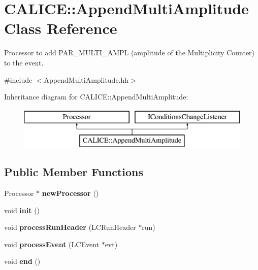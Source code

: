 \section{C\-A\-L\-I\-C\-E\-:\-:Append\-Multi\-Amplitude Class Reference}
\label{classCALICE_1_1AppendMultiAmplitude}


Processor to add P\-A\-R\-\_\-\-M\-U\-L\-T\-I\-\_\-\-A\-M\-P\-L (amplitude of the Multiplicity Counter) to the event.  




{\ttfamily \#include $<$Append\-Multi\-Amplitude.\-hh$>$}

Inheritance diagram for C\-A\-L\-I\-C\-E\-:\-:Append\-Multi\-Amplitude\-:\begin{figure}[H]
\begin{center}
\leavevmode
\includegraphics[height=2.000000cm]{classCALICE_1_1AppendMultiAmplitude}
\end{center}
\end{figure}
\subsection*{Public Member Functions}
\begin{DoxyCompactItemize}
\item 
Processor $\ast$ {\bfseries new\-Processor} ()\label{classCALICE_1_1AppendMultiAmplitude_af5c8a3fce4bc7612157e3d6ad50872d6}

\item 
void {\bfseries init} ()\label{classCALICE_1_1AppendMultiAmplitude_a528565bad5c83a2677bc752f4d47d1f6}

\item 
void {\bfseries process\-Run\-Header} (L\-C\-Run\-Header $\ast$run)\label{classCALICE_1_1AppendMultiAmplitude_a6c147a934e7b60ecbf788f7de33bfde9}

\item 
void {\bfseries process\-Event} (L\-C\-Event $\ast$evt)\label{classCALICE_1_1AppendMultiAmplitude_a80b214680c8275820126d7826b2ca0e0}

\item 
void {\bfseries end} ()\label{classCALICE_1_1AppendMultiAmplitude_a9976e1ce7c039db675881af775f68986}

\end{DoxyCompactItemize}
